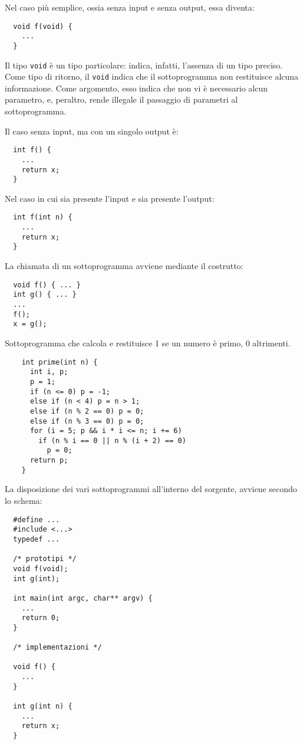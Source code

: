 Nel caso più semplice, ossia senza input e senza output, essa diventa:
\begin{verbatim}
  void f(void) {
    ...
  }
\end{verbatim}

Il tipo \verb|void| è un tipo particolare: indica, infatti, l'assenza di un tipo preciso.
Come tipo di ritorno, il \verb|void| indica che il sottoprogramma non restituisce alcuna informazione. Come argomento, esso indica che non vi è necessario alcun parametro, e, peraltro, rende illegale il passaggio di parametri al sottoprogramma.

Il caso senza input, ma con un singolo output è:
\begin{verbatim}
  int f() {
    ...
    return x;
  }
\end{verbatim}

Nel caso in cui sia presente l'input e sia presente l'output:
\begin{verbatim}
  int f(int n) {
    ...
    return x;
  }
\end{verbatim}

La chiamata di un sottoprogramma avviene mediante il costrutto:
\begin{verbatim}
  void f() { ... }
  int g() { ... }
  ...
  f();
  x = g();
\end{verbatim}

\begin{example}
  Sottoprogramma che calcola e restituisce 1 se un numero è primo, 0 altrimenti.
  \begin{verbatim}
    int prime(int n) {
      int i, p;
      p = 1;
      if (n <= 0) p = -1;
      else if (n < 4) p = n > 1;
      else if (n % 2 == 0) p = 0;
      else if (n % 3 == 0) p = 0;
      for (i = 5; p && i * i <= n; i += 6)
        if (n % i == 0 || n % (i + 2) == 0)
          p = 0;
      return p;
    }
  \end{verbatim}
\end{example}

La disposizione dei vari sottoprogrammi all'interno del sorgente, avviene secondo lo schema:
\begin{verbatim}
  #define ...
  #include <...>
  typedef ...

  /* prototipi */
  void f(void);
  int g(int);

  int main(int argc, char** argv) {
    ...
    return 0;
  }

  /* implementazioni */
  
  void f() {
    ...
  }

  int g(int n) {
    ...
    return x;
  }
\end{verbatim}

